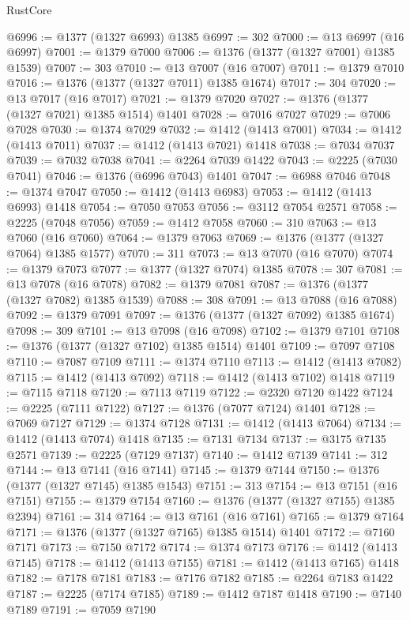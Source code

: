 \begin{lexlean}{RustCore}
\begin{coremodule}
@6996 := @1377 (@1327 @6993) @1385
@6997 := 302
@7000 := @13 @6997 (@16 @6997)
@7001 := @1379 @7000
@7006 := @1376 (@1377 (@1327 @7001) @1385 @1539)
@7007 := 303
@7010 := @13 @7007 (@16 @7007)
@7011 := @1379 @7010
@7016 := @1376 (@1377 (@1327 @7011) @1385 @1674)
@7017 := 304
@7020 := @13 @7017 (@16 @7017)
@7021 := @1379 @7020
@7027 := @1376 (@1377 (@1327 @7021) @1385 @1514) @1401
@7028 := @7016 @7027
@7029 := @7006 @7028
@7030 := @1374 @7029
@7032 := @1412 (@1413 @7001)
@7034 := @1412 (@1413 @7011)
@7037 := @1412 (@1413 @7021) @1418
@7038 := @7034 @7037
@7039 := @7032 @7038
@7041 := @2264 @7039 @1422
@7043 := @2225 (@7030 @7041)
@7046 := @1376 (@6996 @7043) @1401
@7047 := @6988 @7046
@7048 := @1374 @7047
@7050 := @1412 (@1413 @6983)
@7053 := @1412 (@1413 @6993) @1418
@7054 := @7050 @7053
@7056 := @3112 @7054 @2571
@7058 := @2225 (@7048 @7056)
@7059 := @1412 @7058
@7060 := 310
@7063 := @13 @7060 (@16 @7060)
@7064 := @1379 @7063
@7069 := @1376 (@1377 (@1327 @7064) @1385 @1577)
@7070 := 311
@7073 := @13 @7070 (@16 @7070)
@7074 := @1379 @7073
@7077 := @1377 (@1327 @7074) @1385
@7078 := 307
@7081 := @13 @7078 (@16 @7078)
@7082 := @1379 @7081
@7087 := @1376 (@1377 (@1327 @7082) @1385 @1539)
@7088 := 308
@7091 := @13 @7088 (@16 @7088)
@7092 := @1379 @7091
@7097 := @1376 (@1377 (@1327 @7092) @1385 @1674)
@7098 := 309
@7101 := @13 @7098 (@16 @7098)
@7102 := @1379 @7101
@7108 := @1376 (@1377 (@1327 @7102) @1385 @1514) @1401
@7109 := @7097 @7108
@7110 := @7087 @7109
@7111 := @1374 @7110
@7113 := @1412 (@1413 @7082)
@7115 := @1412 (@1413 @7092)
@7118 := @1412 (@1413 @7102) @1418
@7119 := @7115 @7118
@7120 := @7113 @7119
@7122 := @2320 @7120 @1422
@7124 := @2225 (@7111 @7122)
@7127 := @1376 (@7077 @7124) @1401
@7128 := @7069 @7127
@7129 := @1374 @7128
@7131 := @1412 (@1413 @7064)
@7134 := @1412 (@1413 @7074) @1418
@7135 := @7131 @7134
@7137 := @3175 @7135 @2571
@7139 := @2225 (@7129 @7137)
@7140 := @1412 @7139
@7141 := 312
@7144 := @13 @7141 (@16 @7141)
@7145 := @1379 @7144
@7150 := @1376 (@1377 (@1327 @7145) @1385 @1543)
@7151 := 313
@7154 := @13 @7151 (@16 @7151)
@7155 := @1379 @7154
@7160 := @1376 (@1377 (@1327 @7155) @1385 @2394)
@7161 := 314
@7164 := @13 @7161 (@16 @7161)
@7165 := @1379 @7164
@7171 := @1376 (@1377 (@1327 @7165) @1385 @1514) @1401
@7172 := @7160 @7171
@7173 := @7150 @7172
@7174 := @1374 @7173
@7176 := @1412 (@1413 @7145)
@7178 := @1412 (@1413 @7155)
@7181 := @1412 (@1413 @7165) @1418
@7182 := @7178 @7181
@7183 := @7176 @7182
@7185 := @2264 @7183 @1422
@7187 := @2225 (@7174 @7185)
@7189 := @1412 @7187 @1418
@7190 := @7140 @7189
@7191 := @7059 @7190

\end{coremodule}
\end{lexlean}
